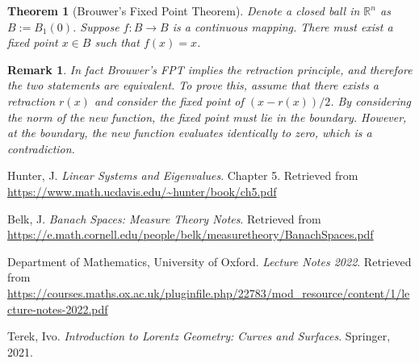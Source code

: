 \documentclass[10pt]{article}
\numberwithin{equation}{section}
\newcommand{\RR}{\mathbb{R}}
\newtheorem{theorem}{Theorem}
\newtheorem{remark}{Remark}
\numberwithin{theorem}{section}
\numberwithin{proposition}{section}
\numberwithin{lemma}{section}
\numberwithin{corollary}{section}
\numberwithin{remark}{section}
\numberwithin{definition}{section}
\numberwithin{example}{section}
\numberwithin{conjecture}{section}
\numberwithin{question}{section}
\begin{document}
    \begin{theorem}[Brouwer's Fixed Point Theorem]
        Denote a closed ball in $\RR^n$ as $B:= B_1(0)$. 
        Suppose $f:B\rightarrow B$ is a continuous mapping. There 
        must exist a fixed point $x \in B$ such that $f(x) = x$. 
    \end{theorem}

    \begin{remark} 
        In fact Brouwer's FPT implies the retraction principle, and 
        therefore the two statements are equivalent. To prove this, assume 
        that there exists a retraction $r(x)$ and consider the fixed point 
        of $(x - r(x))/2$. By considering the norm of the new function, the 
        fixed point must lie in the boundary. However, at the boundary, the 
        new function evaluates identically to zero, which is a contradiction. 
    \end{remark}


\begin{thebibliography}{9}

Hunter, J. 
\newblock \emph{Linear Systems and Eigenvalues}.
\newblock Chapter 5. Retrieved from \url{https://www.math.ucdavis.edu/~hunter/book/ch5.pdf}

Belk, J.
\newblock \emph{Banach Spaces: Measure Theory Notes}.
\newblock Retrieved from \url{https://e.math.cornell.edu/people/belk/measuretheory/BanachSpaces.pdf}

Department of Mathematics, University of Oxford.
\newblock \emph{Lecture Notes 2022}.
\newblock Retrieved from \url{https://courses.maths.ox.ac.uk/pluginfile.php/22783/mod_resource/content/1/lecture-notes-2022.pdf}

Terek, Ivo.
\newblock \emph{Introduction to Lorentz Geometry: Curves and Surfaces}.
\newblock Springer, 2021.

\end{thebibliography}
\end{document}

